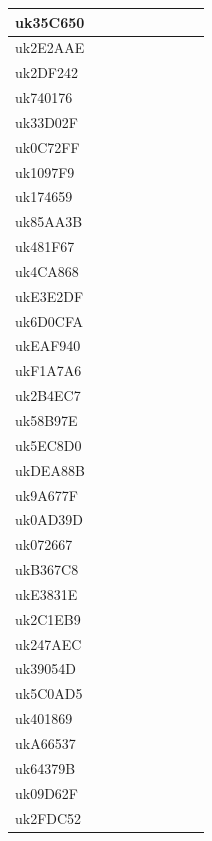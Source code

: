 \documentclass[english]{article}
\begin{document}
\begin{center}
\begin{longtable}{|l|c|c|c|c|c|c|c|c|}
\endlastfoot
\hline
\hline
uk35C650 &  &  &  &  &  & & \\
\hline
uk2E2AAE &  &  &  &  &  & & \\
\hline
uk2DF242 &  &  &  &  &  & & \\
\hline
uk740176 &  &  &  &  &  & & \\
\hline
uk33D02F &  &  &  &  &  & & \\
\hline
uk0C72FF &  &  &  &  &  & & \\
\hline
uk1097F9 &  &  &  &  &  & & \\
\hline
uk174659 &  &  &  &  &  & & \\
\hline
uk85AA3B &  &  &  &  &  & & \\
\hline
uk481F67 &  &  &  &  &  & & \\
\hline
uk4CA868 &  &  &  &  &  & & \\
\hline
ukE3E2DF &  &  &  &  &  & & \\
\hline
uk6D0CFA &  &  &  &  &  & & \\
\hline
ukEAF940 &  &  &  &  &  & & \\
\hline
ukF1A7A6 &  &  &  &  &  & & \\
\hline
uk2B4EC7 &  &  &  &  &  & & \\
\hline
uk58B97E &  &  &  &  &  & & \\
\hline
uk5EC8D0 &  &  &  &  &  & & \\
\hline
ukDEA88B &  &  &  &  &  & & \\
\hline
uk9A677F &  &  &  &  &  & & \\
\hline
uk0AD39D &  &  &  &  &  & & \\
\hline
uk072667 &  &  &  &  &  & & \\
\hline
ukB367C8 &  &  &  &  &  & & \\
\hline
ukE3831E &  &  &  &  &  & & \\
\hline
uk2C1EB9 &  &  &  &  &  & & \\
\hline
uk247AEC &  &  &  &  &  & & \\
\hline
uk39054D &  &  &  &  &  & & \\
\hline
uk5C0AD5 &  &  &  &  &  & & \\
\hline
uk401869 &  &  &  &  &  & & \\
\hline
ukA66537 &  &  &  &  &  & & \\
\hline
uk64379B &  &  &  &  &  & & \\
\hline
uk09D62F &  &  &  &  &  & & \\
\hline
uk2FDC52 &  &  &  &  &  & & \\
\hline

\end{longtable}
\end{center}
\end{document}

